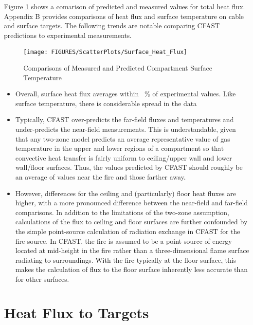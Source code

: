 Figure \ref{fig:Surface_Flux_Scatter} shows a comarison of predicted and measured values for total heat flux. Appendix B provides comparisons of heat flux and surface temperature on cable and surface targets.  The following trends are notable comparing CFAST predictions to experimental measurements.

\begin{figure}
\begin{center}
\texttt{[image: FIGURES/ScatterPlots/Surface\_Heat\_Flux]} 
\end{center}
\caption{Comparisons of Measured and Predicted Compartment Surface Temperature} \label{fig:Surface_Flux_Scatter}
\end{figure}

\begin{itemize}
\item Overall, surface heat flux averages within \Surfacefluxavg ~\% of experimental values.  Like surface temperature, there is considerable spread in the data
\item Typically, CFAST over-predicts the far-field fluxes and temperatures and under-predicts the near-field measurements.  This is understandable, given that any two-zone model predicts an average representative value of gas temperature in the upper and lower regions of a compartment so that convective heat transfer is fairly uniform to ceiling/upper wall and lower wall/floor surfaces.  Thus, the values predicted by CFAST should roughly be an average of values near the fire and those farther away.
\item However, differences for the ceiling and (particularly) floor heat fluxes are higher, with a more pronounced difference between the near-field and far-field comparisons.  In addition to the limitations of the two-zone assumption, calculations of the flux to ceiling and floor surfaces are further confounded by the simple point-source calculation of radiation exchange in CFAST for the fire source.  In CFAST, the fire is assumed to be a point source of energy located at mid-height in the fire rather than a three-dimensional flame surface radiating to surroundings.  With the fire typically at the floor surface, this makes the calculation of flux to the floor surface inherently less accurate than for other surfaces.
\end{itemize}

\section{Heat Flux to Targets}

